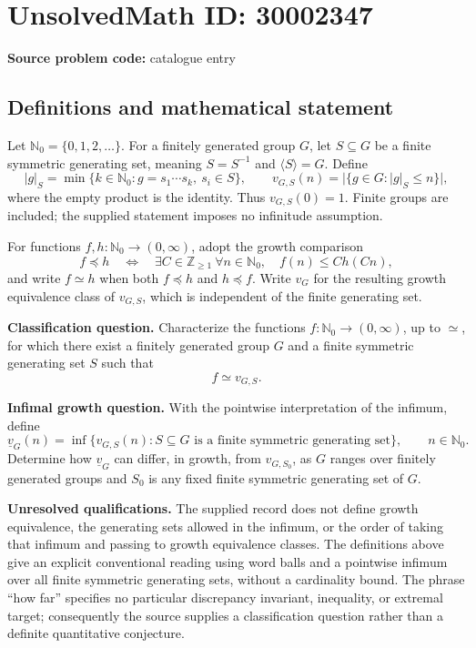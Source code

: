 \documentclass[11pt]{article}
\begin{document}
\section*{UnsolvedMath ID: 30002347}
\textbf{Source problem code:} catalogue entry
\subsection{Definitions and mathematical statement}
Let \(\mathbb N_0=\{0,1,2,\ldots\}\). For a finitely generated group \(G\), let \(S\subseteq G\) be a finite symmetric generating set, meaning \(S=S^{-1}\) and \(\langle S\rangle=G\). Define
\[
 |g|_S=\min\{k\in\mathbb N_0:g=s_1\cdots s_k,\ s_i\in S\},\qquad
 v_{G,S}(n)=\bigl|\{g\in G:|g|_S\le n\}\bigr|,
\]
where the empty product is the identity. Thus \(v_{G,S}(0)=1\). Finite groups are included; the supplied statement imposes no infinitude assumption.

For functions \(f,h:\mathbb N_0\to(0,\infty)\), adopt the growth comparison
\[
 f\preccurlyeq h\quad\Longleftrightarrow\quad
 \exists C\in\mathbb Z_{\ge1}\ \forall n\in\mathbb N_0,
 \quad f(n)\le C h(Cn),
\]
and write \(f\simeq h\) when both \(f\preccurlyeq h\) and \(h\preccurlyeq f\). Write \(v_G\) for the resulting growth equivalence class of \(v_{G,S}\), which is independent of the finite generating set.

\textbf{Classification question.} Characterize the functions \(f:\mathbb N_0\to(0,\infty)\), up to \(\simeq\), for which there exist a finitely generated group \(G\) and a finite symmetric generating set \(S\) such that
\[
 f\simeq v_{G,S}.
\]

\textbf{Infimal growth question.} With the pointwise interpretation of the infimum, define
\[
 \underline v_G(n)=\inf\{v_{G,S}(n):S\subseteq G\text{ is a finite symmetric generating set}\},
 \qquad n\in\mathbb N_0.
\]
Determine how \(\underline v_G\) can differ, in growth, from \(v_{G,S_0}\), as \(G\) ranges over finitely generated groups and \(S_0\) is any fixed finite symmetric generating set of \(G\).

\textbf{Unresolved qualifications.} The supplied record does not define growth equivalence, the generating sets allowed in the infimum, or the order of taking that infimum and passing to growth equivalence classes. The definitions above give an explicit conventional reading using word balls and a pointwise infimum over all finite symmetric generating sets, without a cardinality bound. The phrase ``how far'' specifies no particular discrepancy invariant, inequality, or extremal target; consequently the source supplies a classification question rather than a definite quantitative conjecture.
\end{document}
